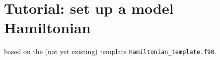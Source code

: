\section{Tutorial: set up a model Hamiltonian}
based on the (not yet existing) template \texttt{Hamiltonian\_template.f90}.
